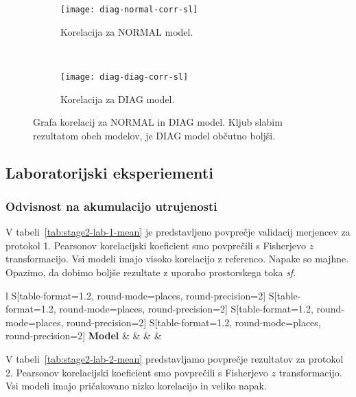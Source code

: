 \begin{figure}[!htb]
	\centering
	\begin{subfigure}[t]{0.45\columnwidth}
		\texttt{[image: diag-normal-corr-sl]}
		\caption{Korelacija za NORMAL model.}
		\label{fig:corr-diag-normal}
	\end{subfigure}
	~
	\begin{subfigure}[t]{0.45\columnwidth}
		\texttt{[image: diag-diag-corr-sl]}
		\caption{Korelacija za DIAG model.}
		\label{fig:corr-diag-diag}
	\end{subfigure}
	\caption[]{Grafa korelacij za NORMAL in DIAG model. Kljub slabim rezultatom obeh modelov, je DIAG model občutno boljši.}
	\label{fig:corr-diag}
\end{figure}


\subsection{Laboratorijski eksperiementi}
\subsubsection{Odvisnost na akumulacijo utrujenosti}
V tabeli~\ref{tab:stage2-lab-1-mean} je predstavljeno povprečje validacij merjencev za protokol 1. Pearsonov korelacijski koeficient \corr smo povprečili s Fisherjevo $z$ transformacijo. Vsi modeli imajo visoko korelacijo z referenco. Napake so majhne. Opazimo, da dobimo boljše rezultate z uporabo prostorskega toka \textit{sf}.

\begin{table}[!htbp]
	\centering
	\begin{tabular}{l S[table-format=1.2, round-mode=places, round-precision=2] S[table-format=1.2, round-mode=places, round-precision=2] S[table-format=1.2, round-mode=places, round-precision=2] S[table-format=1.2, round-mode=places, round-precision=2]}
		\toprule
		\textbf{Model} & \thead{\corr} & \thead{\rae} & \thead{\rrse} & \theadm{\nsv}\\
		\midrule
		\bottomrule
	\end{tabular}
	\caption[Povprečje validacij merjencev za protokol 1 2. faze lab. eksperimentov]{Povprečje validacij merjencev za protokol 1 druge faze laboratorijskih eksperimentov. \corr smo povprečili s Fisherjevo $z$ transformacijo.}
	\label{tab:stage2-lab-1-mean}
\end{table}

V tabeli~\ref{tab:stage2-lab-2-mean}  predstavljamo povprečje rezultatov za protokol 2. Pearsonov korelacijski koeficient \corr smo povprečili s Fisherjevo $z$ transformacijo. Vsi modeli imajo pričakovano nizko korelacijo in veliko napak.

